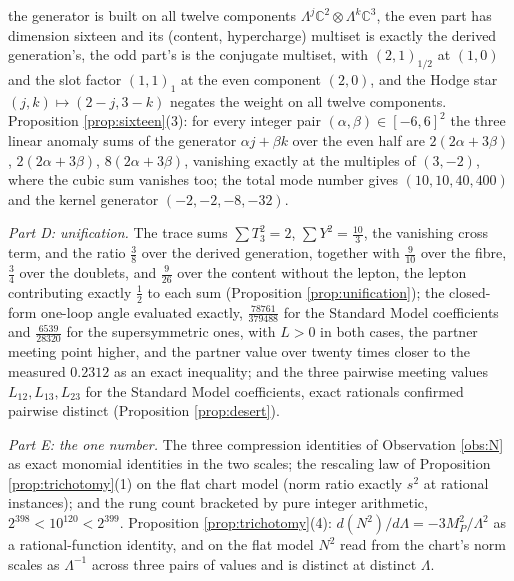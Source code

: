 \documentclass[11pt]{article}
\theoremstyle{definition}
\newcommand{\C}{\mathbb{C}}
\begin{document}
the generator is built on all twelve components $\Lambda^{j}\C^{2} \otimes \Lambda^{k}\C^{3}$, the even part has dimension sixteen and its (content, hypercharge) multiset is exactly the derived generation's, the odd part's is the conjugate multiset, with $(2,1)_{1/2}$ at $(1,0)$ and the slot factor $(1,1)_{1}$ at the even component $(2,0)$, and the Hodge star $(j,k) \mapsto (2-j, 3-k)$ negates the weight on all twelve components. Proposition \ref{prop:sixteen}(3): for every integer pair $(\alpha, \beta) \in [-6, 6]^{2}$ the three linear anomaly sums of the generator $\alpha j + \beta k$ over the even half are $2(2\alpha + 3\beta)$, $2(2\alpha + 3\beta)$, $8(2\alpha + 3\beta)$, vanishing exactly at the multiples of $(3, -2)$, where the cubic sum vanishes too; the total mode number gives $(10, 10, 40, 400)$ and the kernel generator $(-2, -2, -8, -32)$.

\emph{Part D: unification.} The trace sums $\sum T_{3}^{2} = 2$, $\sum Y^{2} = \tfrac{10}{3}$, the vanishing cross term, and the ratio $\tfrac38$ over the derived generation, together with $\tfrac{9}{10}$ over the fibre, $\tfrac34$ over the doublets, and $\tfrac{9}{26}$ over the content without the lepton, the lepton contributing exactly $\tfrac12$ to each sum (Proposition \ref{prop:unification}); the closed-form one-loop angle evaluated exactly, $\tfrac{78761}{379488}$ for the Standard Model coefficients and $\tfrac{6539}{28320}$ for the supersymmetric ones, with $L > 0$ in both cases, the partner meeting point higher, and the partner value over twenty times closer to the measured $0.2312$ as an exact inequality; and the three pairwise meeting values $L_{12}, L_{13}, L_{23}$ for the Standard Model coefficients, exact rationals confirmed pairwise distinct (Proposition \ref{prop:desert}).

\emph{Part E: the one number.} The three compression identities of Observation \ref{obs:N} as exact monomial identities in the two scales; the rescaling law of Proposition \ref{prop:trichotomy}(1) on the flat chart model (norm ratio exactly $s^{2}$ at rational instances); and the rung count bracketed by pure integer arithmetic, $2^{398} < 10^{120} < 2^{399}$. Proposition \ref{prop:trichotomy}(4): $d(N^{2})/d\Lambda = -3M_{P}^{2}/\Lambda^{2}$ as a rational-function identity, and on the flat model $N^{2}$ read from the chart's norm scales as $\Lambda^{-1}$ across three pairs of values and is distinct at distinct $\Lambda$.
\end{document}
